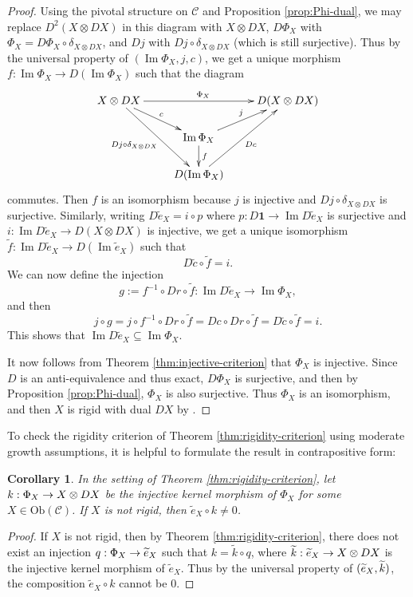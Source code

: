 \documentclass[11pt, reqno]{amsart}
\newtheorem{cor}[thm]{Corollary}
\theoremstyle{definition}\newtheorem{defi}[thm]{Definition}
\theoremstyle{definition}\newtheorem{rem}[thm]{Remark}
\theoremstyle{definition}\newtheorem{exam}[thm]{Example}
\theoremstyle{definition}\newtheorem{assum}[thm]{Assumption}
\newcommand{\cC}{\mathcal{C}}
\newcommand{\til}{\widetilde}
\newcommand{\vac}{\mathbf{1}}
\DeclareMathOperator{\im}{Im}
\let\ker\relax
\DeclareMathOperator{\ker}{Ker}
\begin{document}
\begin{proof}
Using the pivotal structure on $\cC$ and Proposition \ref{prop:Phi-dual}, we may replace $D^2(X\otimes DX)$ in this diagram with $X\otimes DX$, $D\Phi_X$ with $\Phi_X=D\Phi_X\circ\delta_{X\otimes DX}$, and $Dj$ with $Dj\circ\delta_{X\otimes DX}$ (which is still surjective). Thus by the universal property of $(\im\Phi_X, j, c)$, we get a unique morphism $f: \im\Phi_X\rightarrow D(\im\Phi_X)$ such that the diagram
\begin{equation*}
\xymatrixrowsep{1.5pc}
\xymatrix{
X\otimes DX \ar[rd]^c \ar[rdd]_{Dj\circ\delta_{X\otimes DX}} \ar[rr]^{\Phi_X} && D(X\otimes DX)\\
& \im\Phi_X \ar[ru]^j \ar[d]^f & \\
& D(\im\Phi_X) \ar[ruu]_{Dc} & \\
}
\end{equation*}
commutes. Then $f$ is an isomorphism because $j$ is injective and $Dj\circ\delta_{X\otimes DX}$ is surjective. Similarly, writing $D\til{e}_X=i\circ p$ where $p: D\vac\rightarrow\im D\til{e}_X$ is surjective and $i:\im D\til{e}_X\rightarrow D(X\otimes DX)$ is injective, we get a unique isomorphism $\til{f}: \im D\til{e}_X\rightarrow D(\im\til{e}_X)$ such that
\begin{equation*}
D\til{c}\circ\til{f} =i.
\end{equation*}
We can now define the injection 
\begin{equation*}
g:=f^{-1}\circ Dr\circ\til{f}: \im D\til{e}_X\longrightarrow\im\Phi_X,
\end{equation*}
and then
\begin{equation*}
j\circ g = j\circ f^{-1}\circ Dr\circ\til{f} =Dc\circ Dr\circ\til{f} = D\til{c}\circ \til{f} =i.
\end{equation*}
This shows that $\im D\til{e}_X\subseteq\im\Phi_X$.

It now follows from Theorem \ref{thm:injective-criterion} that $\Phi_X$ is injective. Since $D$ is an anti-equivalence and thus exact, $D\Phi_X$ is surjective, and then by Proposition \ref{prop:Phi-dual}, $\Phi_X$ is also surjective. Thus $\Phi_X$ is an isomorphism, and then $X$ is rigid with dual $DX$ by \cite[Corollary 3.6]{BD}.
\end{proof}


To check the rigidity criterion of Theorem \ref{thm:rigidity-criterion} using moderate growth assumptions, it is helpful to formulate the result in contrapositive form:
\begin{cor}\label{cor:non-rigidity-consequence}
In the setting of Theorem \ref{thm:rigidity-criterion}, let $k:\ker\Phi_X\rightarrow X\otimes DX$ be the injective kernel morphism of $\Phi_X$ for some $X\in\mathrm{Ob}(\cC)$. If $X$ is not rigid, then $\til{e}_X\circ k\neq 0$.
\end{cor}
\begin{proof}
If $X$ is not rigid, then by Theorem \ref{thm:rigidity-criterion}, there does not exist an injection $q:\ker \Phi_X\rightarrow\ker\til{e}_X$ such that $k=\til{k}\circ q$, where $\til{k}: \ker\til{e}_X\rightarrow X\otimes DX$ is the injective kernel morphism of $\til{e}_X$. Thus by the universal property of $(\ker\til{e}_X,\til{k})$, the composition $\til{e}_X\circ k$ cannot be $0$.
\end{proof}
\end{document}
